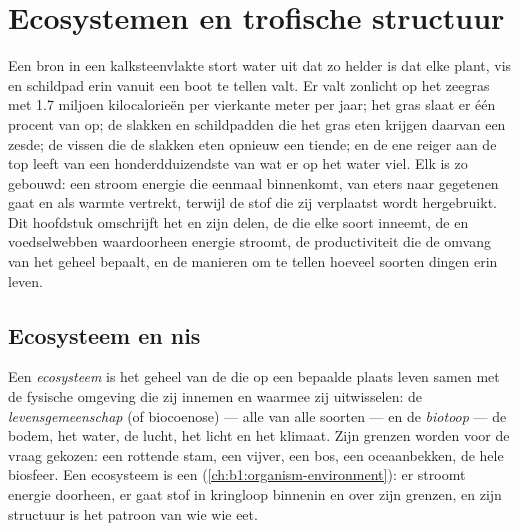 \chapter{Ecosystemen en trofische structuur}\label{ch:b1:ecosystem-organization}

Een bron in een kalksteenvlakte stort water uit dat zo helder is dat elke
plant, vis en schildpad erin vanuit een boot te tellen valt. Er valt
zonlicht op het zeegras met \qty{1.7}{} miljoen kilocalorieën per vierkante
meter per jaar; het gras slaat er één procent van op; de slakken en
schildpadden die het gras eten krijgen daarvan een zesde; de vissen die de
slakken eten opnieuw een tiende; en de ene reiger aan de top leeft van een
honderdduizendste van wat er op het water viel. Elk  is zo
gebouwd: een stroom energie die eenmaal binnenkomt, van eters naar
gegetenen gaat en als warmte vertrekt, terwijl de stof die zij verplaatst
wordt hergebruikt. Dit hoofdstuk omschrijft het  en zijn delen,
de  die elke soort inneemt, de  en voedselwebben
waardoorheen energie stroomt, de productiviteit die de omvang van het
geheel bepaalt, en de manieren om te tellen hoeveel soorten dingen erin
leven.

\section{Ecosysteem en nis}

\begin{definition}\label{def:b1:ecosystem-organization:ecosystem}
Een \emph{ecosysteem} is het geheel van de  die op een bepaalde
plaats leven samen met de fysische omgeving die zij innemen en waarmee zij
uitwisselen: de \emph{levensgemeenschap} (of biocoenose) --- alle 
van alle soorten --- en de \emph{biotoop} --- de bodem, het water, de lucht,
het licht en het klimaat. Zijn grenzen worden voor de vraag gekozen: een
rottende stam, een vijver, een bos, een oceaanbekken, de hele biosfeer. Een
ecosysteem is een  (\cref{ch:b1:organism-environment}): er
stroomt energie doorheen, er gaat stof in kringloop binnenin en over zijn
grenzen, en zijn structuur is het patroon van wie wie eet.
\end{definition}

